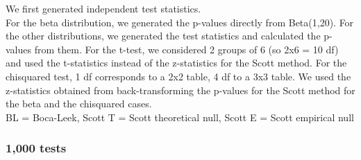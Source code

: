 \documentclass{article}\usepackage[]{graphicx}\usepackage[]{color}
\begin{document}
We first generated independent test statistics.
\\
\noindent For the beta distribution, we generated the p-values directly from Beta(1,20). For the other distributions, we generated the test statistics and calculated the p-values from them.
For the t-test, we considered 2 groups of 6 (so 2x6 = 10 df) and used the t-statistics instead of the z-statistics for the Scott method. For the chisquared test, 1 df corresponds to a 2x2 table, 4 df to a 3x3 table. We used the z-statistics obtained from back-transforming the p-values for the Scott method for the beta and the chisquared cases.
\\
BL = Boca-Leek, Scott T = Scott theoretical null, Scott E = Scott empirical null

\subsubsection*{1,000 tests}
\end{document}
